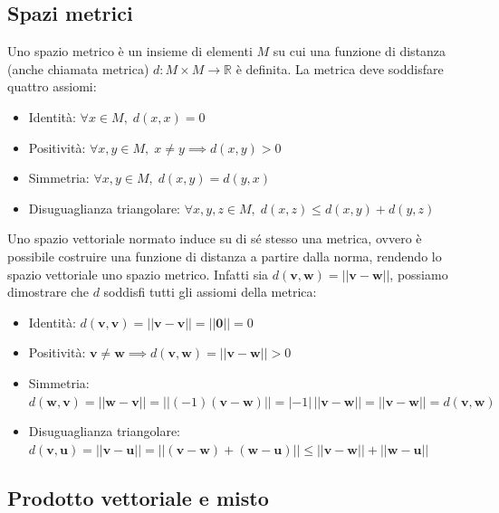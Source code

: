 \vspace{10pt}
\subsection{Spazi metrici} \label{subsec:vsmetric}
    Uno spazio metrico è un insieme di elementi $M$ su cui una funzione di distanza (anche chiamata metrica) $d: M \times M \rightarrow \mathbb{R}$ è definita.
    La metrica deve soddisfare quattro assiomi:

    \begin{itemize}
        \item Identità: $\forall x \in M, \; d(x, x) = 0$
        \item Positività: $\forall x, y \in M, \; x \neq y \implies d(x, y) > 0$
        \item Simmetria: $\forall x, y \in M, \; d(x, y) = d(y, x)$
        \item Disuguaglianza triangolare: $\forall x, y, z \in M, \; d(x, z) \leq d(x, y) + d(y, z)$
    \end{itemize}

    Uno spazio vettoriale normato induce su di sé stesso una metrica, ovvero è possibile costruire una funzione di distanza a partire dalla norma, rendendo lo spazio vettoriale uno spazio metrico.
    Infatti sia $d(\mathbf{v}, \mathbf{w}) = ||\mathbf{v} - \mathbf{w}||$, possiamo dimostrare che $d$ soddisfi tutti gli assiomi della metrica:

    \begin{itemize}
        \item Identità: $d(\mathbf{v}, \mathbf{v}) = ||\mathbf{v} - \mathbf{v}|| = ||\mathbf{0}|| = 0$
        \item Positività: $\mathbf{v} \neq \mathbf{w} \implies d(\mathbf{v}, \mathbf{w}) = ||\mathbf{v} - \mathbf{w}|| > 0$
        \item Simmetria: $d(\mathbf{w}, \mathbf{v}) = ||\mathbf{w} - \mathbf{v}|| = ||(-1)(\mathbf{v} - \mathbf{w})|| = |-1|\,||\mathbf{v} - \mathbf{w}|| = ||\mathbf{v} - \mathbf{w}|| = d(\mathbf{v}, \mathbf{w})$
        \item Disuguaglianza triangolare: $d(\mathbf{v}, \mathbf{u}) = ||\mathbf{v} - \mathbf{u}|| = ||(\mathbf{v} - \mathbf{w}) + (\mathbf{w} - \mathbf{u})|| \leq ||\mathbf{v} - \mathbf{w}|| + ||\mathbf{w} - \mathbf{u}||$
    \end{itemize}

\vspace{10pt}
\subsection{Prodotto vettoriale e misto} \label{subsec:vsoperations}
